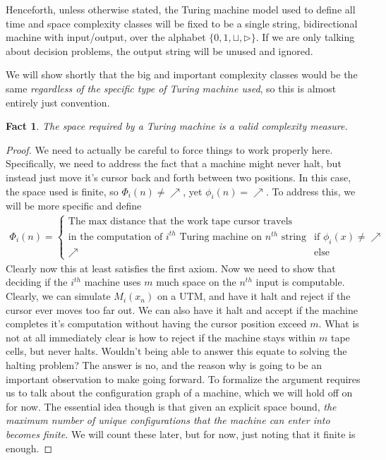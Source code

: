 \documentclass{article}
\theoremstyle{definition}
\theoremstyle{plain}
\theoremstyle{theorem}
\newtheorem{fact}{Fact}[section]
\begin{document}
\begin{center}
	Henceforth, unless otherwise stated, the Turing machine model used to define all time and space complexity classes will be fixed to be a single string, bidirectional machine with input/output, over the alphabet $\{0,1,\sqcup,\triangleright\}$. If we are only talking about decision problems, the output string will be unused and ignored.
\end{center}
We will show shortly that the big and important complexity classes would be the same \textit{regardless of the specific type of Turing machine used}, so this is almost entirely just convention.
\begin{fact}
	The space required by a Turing machine is a valid complexity measure.
\end{fact}
\begin{proof}
	We need to actually be careful to force things to work properly here. Specifically, we need to address the fact that a machine might never halt, but instead just move it's cursor back and forth between two positions. In this case, the space used is finite, so $\Phi_i(n) \neq \nearrow$, yet $\phi_i(n) = \nearrow$. To address this, we will be more specific and define
	\begin{align}
		\Phi_i(n) = \begin{cases}
						\textrm{The max distance that the work tape cursor travels} \\ \textrm{in the computation of $i^{th}$ Turing machine on $n^{th}$ string} & \textrm{if } \phi_i(x) \neq \nearrow \\
						\nearrow & \textrm{else }
					\end{cases}
	\end{align}
	Clearly now this at least satisfies the first axiom. Now we need to show that deciding if the $i^{th}$ machine uses $m$ much space on the $n^{th}$ input is computable. Clearly, we can simulate $M_i(x_n)$ on a UTM, and have it halt and reject if the cursor ever moves too far out. We can also have it halt and accept if the machine completes it's computation without having the cursor position exceed $m$. What is not at all immediately clear is how to reject if the machine stays within $m$ tape cells, but never halts. Wouldn't being able to answer this equate to solving the halting problem? The answer is no, and the reason why is going to be an important observation to make going forward. To formalize the argument requires us to talk about the configuration graph of a machine, which we will hold off on for now. The essential idea though is that given an explicit space bound, \textit{the maximum number of unique configurations that the machine can enter into becomes finite.} We will count these later, but for now, just noting that it finite is enough. 

\end{proof}
\end{document}

